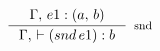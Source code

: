 \documentclass[preview]{standalone}
\begin{document}
$\inference {\Gamma, \, e1 : (a, \, b)}{\Gamma, \, \vdash (snd \, e1) : b}[snd]$
\end{document}

